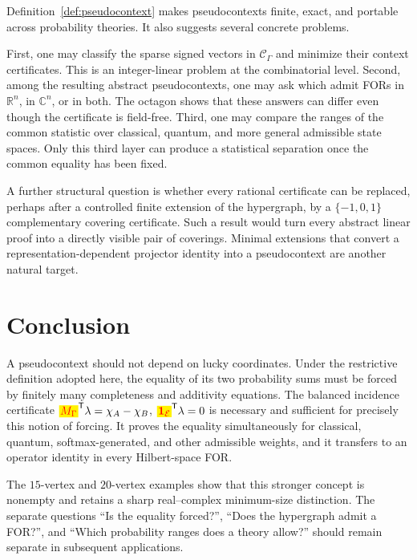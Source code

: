 \documentclass[
  twocolumn,
  aps,
  pra,
  floatfix,
  amsmath,amssymb,
  longbibliography
]{revtex4-2}
\theoremstyle{definition}
\theoremstyle{remark}
\newcommand{\R}{\mathbb R}
\newcommand{\C}{\mathbb C}
\newcommand{\E}{\mathcal E}
\newcommand{\one}{\mathbf 1}
\newcommand{\corrmath}[1]{\begingroup\setlength{\fboxsep}{1pt}\colorbox{yellow}{\ensuremath{\color{red}#1}}\endgroup}
\begin{document}
Definition~\ref{def:pseudocontext} makes pseudocontexts finite, exact, and portable across
probability theories.  It also suggests several concrete problems.

First, one may classify the sparse signed vectors in
$\mathcal C_\Gamma$ and minimize their context certificates.  This is an
integer-linear problem at the combinatorial level.  Second, among the
resulting abstract pseudocontexts, one may ask which admit FORs in $\R^n$,
in $\C^n$, or in both.  The octagon shows that
these answers can differ even though the certificate is field-free.  Third,
one may compare the ranges of the common statistic over classical,
quantum, and more general admissible state spaces.  Only this third layer can
produce a statistical separation once the common equality has been fixed.

A further structural question is whether every rational certificate can be
replaced, perhaps after a controlled finite extension of the hypergraph, by a
$\{-1,0,1\}$ complementary covering certificate.  Such a result would turn
every abstract linear proof into a directly visible pair of coverings.
Minimal extensions that convert a representation-dependent projector
identity into a pseudocontext are another natural target.

\section{Conclusion}

A pseudocontext should not depend on lucky coordinates.  Under the
restrictive definition adopted here, the equality of its two probability
sums must be forced by finitely many completeness and additivity equations.
The balanced incidence certificate
$\corrmath{M_\Gamma}^{\mathsf T}\lambda=\chi_A-\chi_B$,
$\corrmath{\one_\E}^{\mathsf T}\lambda=0$ is necessary and sufficient for precisely this
notion of forcing.  It proves the equality simultaneously for classical,
quantum, softmax-generated, and other admissible weights, and it transfers to
an operator identity in every Hilbert-space FOR.

The $15$-vertex and $20$-vertex examples show that this stronger concept is
nonempty and retains a sharp real--complex minimum-size distinction.  The
separate questions ``Is the equality forced?'', ``Does the hypergraph admit
a FOR?'', and ``Which probability ranges does a theory
allow?'' should remain separate in subsequent applications.
\end{document}
